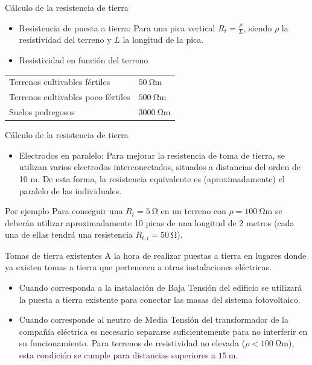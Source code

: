 \documentclass[xcolor={usenames,svgnames,dvipsnames}]{beamer}
\begin{document}
\begin{frame}[label=sec-3-0-4]{Cálculo de la resistencia de tierra}
\begin{itemize}
\item \alert{Resistencia de puesta a tierra}: Para una pica vertical $R_{t}=\frac{\rho}{L}$, siendo $\rho$ la resistividad del terreno y $L$ la longitud de la pica.

\item \alert{Resistividad en función del terreno}
\end{itemize}

\begin{center}
\begin{tabular}{ll}
Terrenos cultivables fértiles & $\SI{50}{\ohm\meter}$\\
Terrenos cultivables poco fértiles & $\SI{500}{\ohm\meter}$\\
Suelos pedregosos & $\SI{3000}{\ohm\meter}$\\
\end{tabular}
\end{center}
\end{frame}

\begin{frame}[label=sec-3-0-5]{Cálculo de la resistencia de tierra}
\begin{itemize}
\item \alert{Electrodos en paralelo}: Para mejorar la resistencia de toma de tierra, se utilizan varios electrodos interconectados, situados a distancias del orden de 10 m. De esta forma, \alert{la resistencia equivalente es (aproximadamente) el paralelo de las individuales}.
\end{itemize}

\begin{block}{Por ejemplo}
Para conseguir una $R_{t}=\SI{5}{\ohm}$ en un terreno con
$\rho=\SI{100}{\ohm\meter}$ se deberán utilizar aproximadamente 10 picas de
una longitud de 2 metros (cada una de ellas tendrá una resistencia
$R_{t,i}=\SI{50}{\ohm}$).
\end{block}
\end{frame}

\begin{frame}[label=sec-3-0-6]{Tomas de tierra existentes}
A la hora de realizar puestas a tierra en lugares donde ya existen tomas
a tierra que pertenecen a otras instalaciones eléctricas.

\begin{itemize}
\item Cuando corresponda a la \alert{instalación de Baja Tensión del edificio}
\alert{se utilizará la puesta a tierra existente} para conectar las masas
del sistema fotovoltaico.

\item Cuando corresponde al \alert{neutro de Media Tensión del transformador de
la compañía eléctrica} es necesario \alert{separarse suficientemente} para
no interferir en su funcionamiento. Para terrenos de resistividad no
elevada ($\rho<\SI{100}{\ohm\meter}$), esta condición se cumple para
distancias superiores a $\SI{15}{\meter}$.
\end{itemize}
\end{frame}
\end{document}
